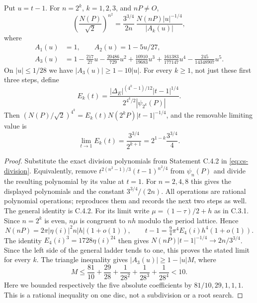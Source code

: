 \begin{statement}
Put $u=t-1$. For $n=2^k$, $k=1,2,3$, and $nP\ne O$,
\begin{equation}\label{eq:ca-ladder}
 \left(\frac{N(P)}{\sqrt2}\right)^{n^2}
 =\frac{3^{3/4}}{2n}\,
       \frac{N(nP)|u|^{-1/4}}{|A_k(u)|},
\end{equation}
where
\begin{align*}
 A_1(u)&=1,\qquad A_2(u)=1-5u/27,\\
 A_3(u)&=1-\frac{217}{27}u-\frac{20486}{729}u^2
       +\frac{10910}{19683}u^3
       +\frac{161383}{177147}u^4
       -\frac{245}{14348907}u^5.
\end{align*}
On $|u|\le1/28$ we have $|A_3(u)|\ge1-10|u|$.
For every $k\ge1$, not just these first three steps, define
\[
 E_k(t)=\frac{|\Delta_E|^{(4^k-1)/12}|t-1|^{1/4}}
 {2^{4^k/2}|\psi_{2^k}(P)|}.
\]
Then $(N(P)/\sqrt2)^{4^k}=E_k(t)N(2^kP)|t-1|^{-1/4}$,
and the removable limiting value is
\[
 \lim_{t\to1}E_k(t)=\frac{3^{3/4}}{2^{k+1}}
                 =2^{1-k}\frac{3^{3/4}}4.
\]
\end{statement}
\begin{proof}
Substitute the exact division polynomials from Statement C.4.2
in \eqref{eq:cs-division}. Equivalently, remove
$t^{2(n^2-1)/3}(t-1)^{n^2/4}$ from $\psi_n(P)$ and divide
the resulting polynomial by its value at $t=1$. For $n=2,4,8$
this gives the displayed polynomials and the constant
$3^{3/4}/(2n)$. All operations are rational polynomial operations;
 reproduces them and records
the next two steps as well. The general identity is C.4.2.
For its limit write $\mu=(1-\tau)/2+h$ as in C.3.1. Since
$n=2^k$ is even, $n\mu$ is congruent to $nh$ modulo the
period lattice. Hence
\[
 N(nP)=2\pi|\eta(i)|^2 n|h|(1+o(1)),\qquad
 t-1=\tfrac94\pi^4E_4(i)h^4(1+o(1)).
\]
The identity $E_4(i)^3=1728\eta(i)^{24}$ then gives
$N(nP)|t-1|^{-1/4}\to2n/3^{3/4}$.
Since the left side of the general ladder tends to one,
this proves the stated limit for every $k$.
The triangle inequality gives
$|A_3(u)|\ge1-|u|M$, where
\[
 M\le\frac{81}{10}+\frac{29}{28}
                +\frac1{28^2}+\frac1{28^3}+\frac1{28^4}<10.
\]
Here we bounded respectively the five absolute coefficients by
$81/10,29,1,1,1$. This is a rational inequality on one disc,
not a subdivision or a root search.
\end{proof}

